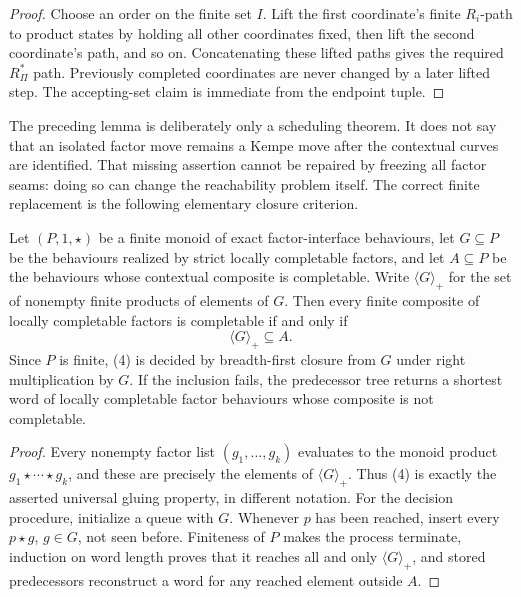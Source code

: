 \begin{proof}
Choose an order on the finite set $I$.  Lift the first coordinate's finite
$R_i$-path to product states by holding all other coordinates fixed, then
lift the second coordinate's path, and so on.  Concatenating these lifted
paths gives the required $R_{\Pi}^{*}$ path.  Previously completed
coordinates are never changed by a later lifted step.  The accepting-set
claim is immediate from the endpoint tuple.
\end{proof}

The preceding lemma is deliberately only a scheduling theorem.  It does not
say that an isolated factor move remains a Kempe move after the contextual
curves are identified.  That missing assertion cannot be repaired by freezing
all factor seams: doing so can change the reachability problem itself.  The
correct finite replacement is the following elementary closure criterion.

\begin{lemma}
\label{lem:finite-factor-synchronization}
\Sprose
Let $(P,1,\star)$ be a finite monoid of exact factor-interface behaviours,
let $G\subseteq P$ be the behaviours realized by strict locally completable
factors, and let $A\subseteq P$ be the behaviours whose contextual composite
is completable.  Write $\langle G\rangle_{+}$ for the set of nonempty finite
products of elements of $G$.  Then every finite composite of locally
completable factors is completable if and only if
\[
                         \langle G\rangle_{+}\subseteq A.       \tag{4}
\]
Since $P$ is finite, (4) is decided by breadth-first closure from $G$ under
right multiplication by $G$.  If the inclusion fails, the predecessor tree
returns a shortest word of locally completable factor behaviours whose
composite is not completable.
\end{lemma}

\begin{proof}
Every nonempty factor list $(g_1,\ldots,g_k)$ evaluates to the monoid product
$g_1\star\cdots\star g_k$, and these are precisely the elements of
$\langle G\rangle_{+}$.  Thus (4) is exactly the asserted universal gluing
property, in different notation.  For the decision procedure, initialize a
queue with $G$.  Whenever $p$ has been reached, insert every
$p\star g$, $g\in G$, not seen before.  Finiteness of $P$ makes the process
terminate, induction on word length proves that it reaches all and only
$\langle G\rangle_{+}$, and stored predecessors reconstruct a word for any
reached element outside $A$.
\end{proof}

